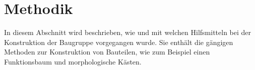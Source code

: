 \chapter{Methodik}
In diesem Abschnitt wird beschrieben, wie und mit welchen Hilfsmitteln bei der Konstruktion der Baugruppe vorgegangen wurde.
Sie enthält die gängigen Methoden zur Konstruktion von Bauteilen, wie zum Beispiel einen Funktionsbaum und morphologische Kästen. 
